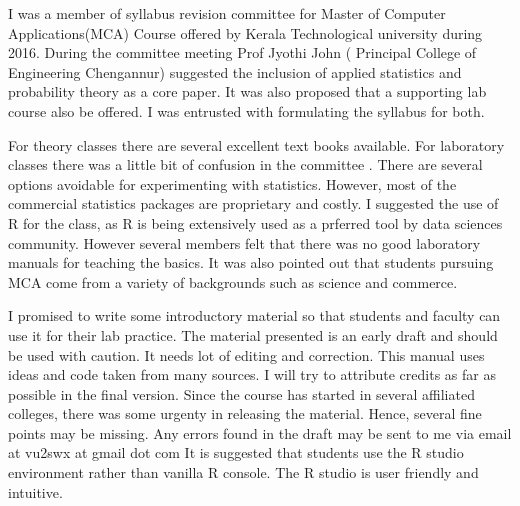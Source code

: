 \documentclass["../Applied_probabillity _and_statistics_lab_KTU.tex"]{subfiles}
\begin{document}
      I was a member of syllabus revision committee for Master of Computer Applications(MCA) Course  offered by  Kerala Technological university during 2016. During the committee meeting Prof Jyothi John ( Principal College of Engineering  Chengannur) suggested the inclusion of applied statistics and probability theory as a core paper. It was also proposed  that a supporting lab course  also be  offered. I was entrusted with formulating the syllabus for both. 
       
       For  theory classes there are several excellent text books available.  For laboratory classes there was a little bit of confusion in the committee . There are several options avoidable for experimenting with statistics.   However, most of the commercial statistics packages  are proprietary and costly.  I suggested the use of R for the class, as R is being extensively used as a prferred tool by data sciences community.  However  several members felt that there was no good laboratory manuals for  teaching the basics. It  was also pointed out that students pursuing   MCA come from a variety of backgrounds such as science and commerce. 
       
       I promised to write some introductory material so that students  and  faculty can use it for their lab practice. The material presented is  an early draft and should be used with caution. It needs lot of editing and  correction. This manual uses ideas and code taken from many sources. I will try to attribute credits as far as possible in the final version. Since the course has started in several affiliated colleges, there was some urgenty in releasing the material. Hence, several fine points may be missing.   Any errors found in the draft may be  sent to me via email at vu2swx  at gmail dot com
       It is suggested that students use the R studio environment rather than vanilla R console. The R studio is user friendly and intuitive.
       
 
\end{document}
